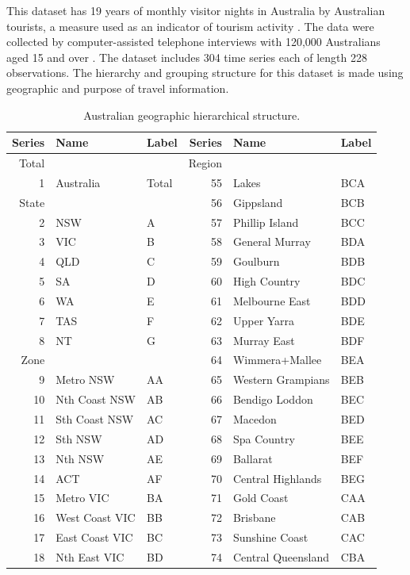 \documentclass[11pt,a4paper,]{article}
\begin{document}
This dataset has 19 years of monthly visitor nights in Australia by Australian tourists, a measure used as an indicator of tourism activity \autocite{mint2018}. The data were collected by computer-assisted telephone interviews with 120,000 Australians aged 15 and over \autocite{researchAustralia2005}. The dataset includes 304 time series each of length 228 observations. The hierarchy and grouping structure for this dataset is made using geographic and purpose of travel information.

\begingroup\fontsize{9}{11}\selectfont

\begin{longtable}[t]{rllrll}
\caption{\label{tab:Australiageographicaldivision}Australian geographic hierarchical structure.}\\
\toprule
Series & Name & Label & Series & Name & Label\\
\midrule
Total &  &  & Region &  & \\
1 & Australia & Total & 55 & Lakes & BCA\\
State &  &  & 56 & Gippsland & BCB\\
2 & NSW & A & 57 & Phillip Island & BCC\\
3 & VIC & B & 58 & General Murray & BDA\\
4 & QLD & C & 59 & Goulburn & BDB\\
5 & SA & D & 60 & High Country & BDC\\
6 & WA & E & 61 & Melbourne East & BDD\\
7 & TAS & F & 62 & Upper Yarra & BDE\\
8 & NT & G & 63 & Murray East & BDF\\
Zone &  &  & 64 & Wimmera+Mallee & BEA\\
9 & Metro NSW & AA & 65 & Western Grampians & BEB\\
10 & Nth Coast NSW & AB & 66 & Bendigo Loddon & BEC\\
11 & Sth Coast NSW & AC & 67 & Macedon & BED\\
12 & Sth NSW & AD & 68 & Spa Country & BEE\\
13 & Nth NSW & AE & 69 & Ballarat & BEF\\
14 & ACT & AF & 70 & Central Highlands & BEG\\
15 & Metro VIC & BA & 71 & Gold Coast & CAA\\
16 & West Coast VIC & BB & 72 & Brisbane & CAB\\
17 & East Coast VIC & BC & 73 & Sunshine Coast & CAC\\
18 & Nth East VIC & BD & 74 & Central Queensland & CBA\\

\end{longtable}
\end{document}
